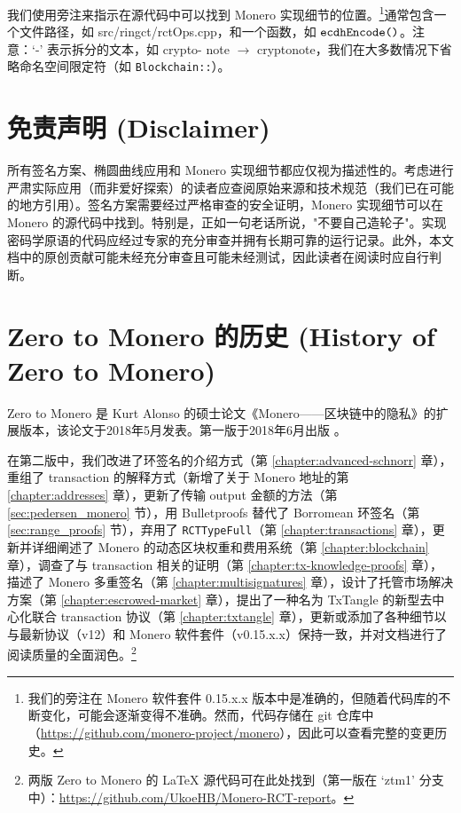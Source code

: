 我们使用旁注来指示在源代码中可以找到 Monero 实现细节的位置。\footnote{我们的旁注在 Monero 软件套件 0.15.x.x 版本中是准确的，但随着代码库的不断变化，可能会逐渐变得不准确。然而，代码存储在 git 仓库中（\url{https://github.com/monero-project/monero}），因此可以查看完整的变更历史。}通常包含一个文件路径，如 src/ringct/rctOps.cpp，和一个函数，如 \(\textrm{{\tt ecdhEncode()}}\)。注意：`-' 表示拆分的文本，如 crypto- note $\rightarrow$ cryptonote，我们在大多数情况下省略命名空间限定符（如 {\tt Blockchain::}）。



\section{免责声明 (Disclaimer)}

所有签名方案、椭圆曲线应用和 Monero 实现细节都应仅视为描述性的。考虑进行严肃实际应用（而非爱好探索）的读者应查阅原始来源和技术规范（我们已在可能的地方引用）。签名方案需要经过严格审查的安全证明，Monero 实现细节可以在 Monero 的源代码中找到。特别是，正如一句老话所说，"不要自己造轮子"。实现密码学原语的代码应经过专家的充分审查并拥有长期可靠的运行记录。此外，本文档中的原创贡献可能未经充分审查且可能未经测试，因此读者在阅读时应自行判断。


\section{Zero to Monero 的历史 (History of Zero to Monero)}

Zero to Monero 是 Kurt Alonso 的硕士论文《Monero——区块链中的隐私》\cite{kurt-original}的扩展版本，该论文于2018年5月发表。第一版于2018年6月出版 \cite{ztm-1}。

在第二版中，我们改进了环签名的介绍方式（第 \ref{chapter:advanced-schnorr} 章），重组了 transaction 的解释方式（新增了关于 Monero 地址的第 \ref{chapter:addresses} 章），更新了传输 output 金额的方法（第 \ref{sec:pedersen_monero} 节），用 Bulletproofs 替代了 Borromean 环签名（第 \ref{sec:range_proofs} 节），弃用了 {\tt RCTTypeFull}（第 \ref{chapter:transactions} 章），更新并详细阐述了 Monero 的动态区块权重和费用系统（第 \ref{chapter:blockchain} 章），调查了与 transaction 相关的证明（第 \ref{chapter:tx-knowledge-proofs} 章），描述了 Monero 多重签名（第 \ref{chapter:multisignatures} 章），设计了托管市场解决方案（第 \ref{chapter:escrowed-market} 章），提出了一种名为 TxTangle 的新型去中心化联合 transaction 协议（第 \ref{chapter:txtangle} 章），更新或添加了各种细节以与最新协议（v12）和 Monero 软件套件（v0.15.x.x）保持一致，并对文档进行了阅读质量的全面润色。\footnote{两版 Zero to Monero 的 \LaTeX{} 源代码可在此处找到（第一版在 `ztm1' 分支中）：\url{https://github.com/UkoeHB/Monero-RCT-report}。}



